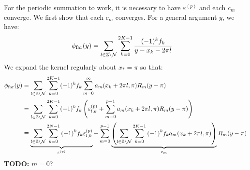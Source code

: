 For the periodic summation to work, it is necessary to have
$\varepsilon^{(p)}$ and each $c_m$ converge. We first show that each
$c_m$ converges. For a general argument $y$, we have:
\begin{align*}
  \phi_{\operatorname{far}}(y) &= \sum_{l \in \mathbb{Z} \backslash \mathcal{N}} \sum_{k=0}^{2K-1} \frac{(-1)^k f_k}{y - x_k - 2\pi l}
\end{align*}
We expand the kernel regularly about $x_* = \pi$ so that:
\begin{align*}
  \phi_{\operatorname{far}}(y) &= \sum_{l \in \mathbb{Z} \backslash \mathcal{N}} \sum_{k=0}^{2K-1} (-1)^k f_k \sum_{m=0}^\infty a_m(x_k + 2\pi l, \pi) R_m(y - \pi) \\
  &= \sum_{l \in \mathbb{Z} \backslash \mathcal{N}} \sum_{k=0}^{2K-1} (-1)^k f_k \left(\varepsilon_{l,k}^{(p)} + \sum_{m=0}^{p-1} a_m(x_k + 2\pi l, \pi) R_m(y - \pi)\right) \\
  &\equiv \underbrace{\sum_{l \in \mathbb{Z} \backslash \mathcal{N}} \sum_{k=0}^{2N-1} {(-1)}^k f_k \varepsilon_{l,k}^{(p)}}_{\varepsilon^{(p)}} + \sum_{m=0}^{p-1} \underbrace{\left(\sum_{l \in \mathbb{Z} \backslash \mathcal{N}} \sum_{k=0}^{2K-1} {(-1)}^k f_k a_m(x_k + 2\pi l, \pi)\right)}_{c_m} R_m(y - \pi)
\end{align*}
\textbf{TODO:} $m = 0$?

